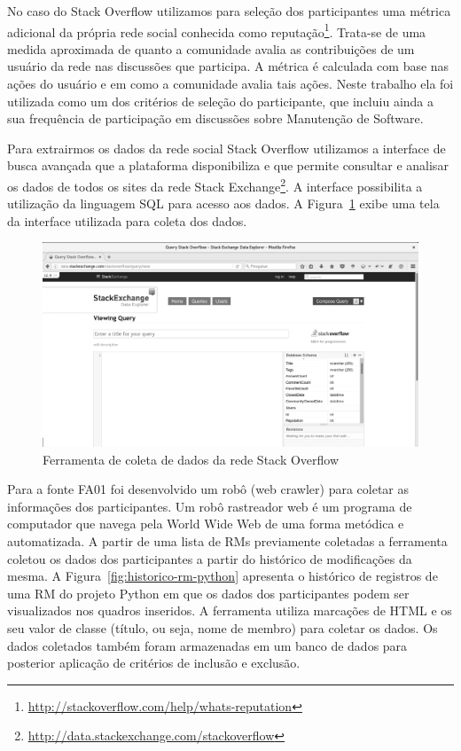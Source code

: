 No caso do Stack Overflow utilizamos para seleção dos participantes uma métrica
adicional da própria rede social conhecida como
reputação\footnote{\url{http://stackoverflow.com/help/whats-reputation}}.
Trata-se de uma medida aproximada de quanto a comunidade avalia as
contribuições de um usuário da rede nas discussões que participa. A métrica é
calculada com base nas ações do usuário e em como a comunidade avalia tais
ações. Neste trabalho ela foi utilizada como um dos critérios de seleção do
participante, que incluiu ainda a sua frequência de participação em discussões
sobre Manutenção de Software.

Para extrairmos os dados da rede social Stack Overflow utilizamos a interface de
busca avançada que a plataforma disponibiliza e que permite consultar e analisar
os dados de todos os sites da rede Stack
Exchange\footnote{\url{http://data.stackexchange.com/stackoverflow}}. A
interface possibilita a utilização da linguagem SQL para acesso aos dados. A
Figura~\ref{fig:stack-exchange} exibe uma tela da interface utilizada para
coleta dos dados.

\begin{figure}[htpb]
	\centering
	\includegraphics[width=0.7\linewidth]{./chapter-pesquisa-com-profissionais/img/stack-exchange.png}
	\caption{Ferramenta de coleta de dados da rede Stack Overflow}
\label{fig:stack-exchange}
\end{figure}

Para a fonte FA01 foi desenvolvido um robô (web crawler) para coletar as
informações dos participantes. Um robô rastreador web é um programa de
computador que navega pela World Wide Web de uma forma metódica e automatizada.
A partir de uma lista de RMs previamente coletadas a ferramenta coletou os dados
dos participantes a partir do histórico de modificações da mesma. A
Figura~\ref{fig:historico-rm-python} apresenta o histórico de registros de uma
RM do projeto Python em que os dados dos participantes podem ser visualizados
nos quadros inseridos. A ferramenta utiliza marcações de HTML e os seu valor de
classe (título, ou seja, nome de membro) para coletar os dados. Os dados
coletados também foram armazenadas em um banco de dados para posterior aplicação
de critérios de inclusão e exclusão.

